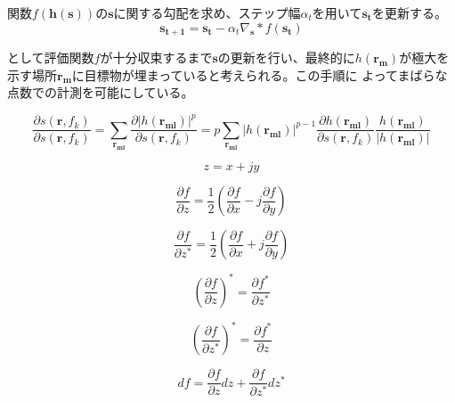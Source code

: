 \documentclass[12pt,a4paper]{jsreport}
\begin{document}
関数$f(\bm{h({\bm{s}})})$の$\bm{s}$に関する勾配を求め、ステップ幅$\alpha_{t}$を用いて$\bm{s_{t}}$を更新する。
\begin{equation}
  \bm{s_{t+1}}=\bm{s_{t}}-\alpha_{t}\nabla_{\bm{s}}*f(\bm{s_{t}})
  \end{equation}

として評価関数$f$が十分収束するまで$\bm{s}$の更新を行い、最終的に$h(\bm{r_{m}})$が極大を示す場所$\bm{r_{m}}$に目標物が埋まっていると考えられる。この手順に
よってまばらな点数での計測を可能にしている。


\begin{equation}
  \frac{\partial s(\bm{r},f_{k})}{\partial s(\bm{r},f_{k})}
  = \sum_{\bm{r_{ml}}}  \frac{\partial |h(\bm{r_{ml}})|^{p} }{\partial s(\bm{r},f_{k})}
  =p \sum_{\bm{r_{ml}}} |h(\bm{r_{ml}})|^{p-1} \frac{\partial h(\bm{r_{ml}}) }{\partial s(\bm{r},f_{k})}  \frac{ h(\bm{r_{ml}}) }{ |h(\bm{r_{ml}}) |}
      \label{sの偏微分の再定義}
  \end{equation}


  \begin{equation}
    z = x + jy
        \label{z}
    \end{equation}
  

\begin{equation}
  \frac{\partial f}{\partial z}
  =\dfrac{1}{2}(\frac{\partial f}{\partial x} - j \frac{\partial f}{\partial y})
      \label{fのz偏微分}
  \end{equation}

  \begin{equation}
    \frac{\partial f}{\partial z^{*}}
    =\dfrac{1}{2}(\frac{\partial f}{\partial x} + j \frac{\partial f}{\partial y})
        \label{fの共役z偏微分}
    \end{equation}
  
\begin{equation}
  \left(
    \frac{\partial f}{\partial z}
    \right)
    ^{*}
  =\frac{\partial f^{*}}{\partial z^{*}}
      \label{conjugationrule0}
  \end{equation}    

  \begin{equation}
    \left(
      \frac{\partial f}{\partial z^{*}}
      \right)
      ^{*}
    =\frac{\partial f^{*}}{\partial z}
        \label{conjugationrule1}
    \end{equation}    

\begin{equation}
  df
  =\frac{\partial f}{\partial z}dz +  \frac{\partial f}{\partial z^{*}}dz^{*}
      \label{fの全微分}
  \end{equation}    
\end{document}
